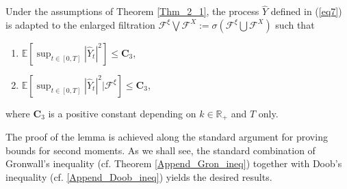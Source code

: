 \begin{lemma}\label{lem2_1}
Under the assumptions of Theorem \ref{Thm_2_1}, the process $\hat{Y}$ defined in (\ref{eq7}) is adapted to the enlarged filtration $\mathcal{F}^{\xi} \bigvee \mathcal{F}^{X} := \sigma (\mathcal{F}^{\xi} \bigcup \mathcal{F}^{X})$ such that
    \begin{enumerate}[label=(\roman*)]
        \item $\mathbb{E}[\sup_{t \in [0, T]} |\hat{Y}_t|^2] \leq \mathbf{C}_3$, \label{lemma_1}
        \item $\mathbb{E}[\sup_{t \in [0, T]} |\hat{Y}_t|^2  |\mathcal{F}^{\xi} ] \leq \mathbf{C}_3$, \label{lemma_2}
    \end{enumerate}
where $\mathbf{C}_3$ is a positive constant depending on $k \in \mathbb{R}_+$ and $T$ only. 
\end{lemma}
The proof of the lemma is achieved along the standard argument for proving bounds for second moments. As we shall see, the standard combination of Gronwall's inequality (cf. Theorem \ref{Append_Gron_ineq}) together with Doob's
inequality (cf. \eqref{Append_Doob_ineq}) yields the desired results.
